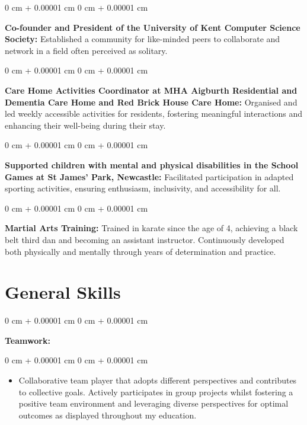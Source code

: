 \documentclass[10pt, letterpaper]{article}
\newenvironment{highlights}{
    \begin{itemize}[
        topsep=0.10 cm,
        parsep=0.10 cm,
        partopsep=0pt,
        itemsep=0pt,
        leftmargin=0 cm + 10pt
    ]
}{
    \end{itemize}
} %
\newenvironment{onecolentry}{
    \begin{adjustwidth}{
        0 cm + 0.00001 cm
    }{
        0 cm + 0.00001 cm
    }
}{
    \end{adjustwidth}
} %
\newenvironment{twocolentry}[2][]{
    \onecolentry
    \def\secondColumn{#2}
    \setcolumnwidth{\fill, 4.5 cm}
    \begin{paracol}{2}
}{
    \switchcolumn \raggedleft \secondColumn
    \end{paracol}
    \endonecolentry
} %
\begin{document}
        \begin{onecolentry}
            \textbf{Co-founder and President of the University of Kent Computer Science Society:} Established a community for like-minded peers to collaborate and network in a field often perceived as solitary.
        \end{onecolentry}

        \vspace{0.05 cm}

        \begin{onecolentry}
            \textbf{Care Home Activities Coordinator at MHA Aigburth Residential and Dementia Care Home and Red Brick House Care Home:} Organised and led weekly accessible activities for residents, fostering meaningful interactions and enhancing their well-being during their stay. 
        \end{onecolentry}
         \vspace{0.05 cm}

        \begin{onecolentry}
            \textbf{Supported children with mental and physical disabilities in the School Games at St James’ Park, Newcastle:} Facilitated participation in adapted sporting activities, ensuring enthusiasm, inclusivity, and accessibility for all. 
        \end{onecolentry}
          \vspace{0.05 cm}

        \begin{onecolentry}
            \textbf{Martial Arts Training:} Trained in karate since the age of 4, achieving a black belt third dan and becoming an assistant instructor. Continuously developed both physically and mentally through years of determination and practice.
        \end{onecolentry}
    
    

    \section{General Skills}
       

        \begin{twocolentry}{
            
        }
            \textbf{Teamwork:}\end{twocolentry}

        \vspace{-0.05 cm}
        \begin{onecolentry}
            \begin{highlights}
                \item Collaborative team player that adopts different perspectives and contributes to collective goals. Actively participates in group projects whilst fostering a positive team environment and leveraging diverse perspectives for optimal outcomes as displayed throughout my education.
                
            \end{highlights}
        \end{onecolentry}
\vspace{0.2 cm}
\end{document}
